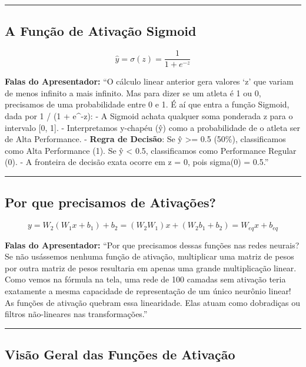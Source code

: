 \documentclass[
  letterpaper,
  DIV=11,
  numbers=noendperiod]{scrartcl}
\begin{document}
\begin{center}\rule{0.5\linewidth}{0.5pt}\end{center}

\subsection{A Função de Ativação
Sigmoid}\label{a-funuxe7uxe3o-de-ativauxe7uxe3o-sigmoid}

\[\hat{y} = \sigma(z) = \frac{1}{1 + e^{-z}}\]

\textbf{Falas do Apresentador:} ``O cálculo linear anterior gera valores
`z' que variam de menos infinito a mais infinito. Mas para dizer se um
atleta é 1 ou 0, precisamos de uma probabilidade entre 0 e 1. É aí que
entra a função Sigmoid, dada por 1 / (1 + e\^{}-z): - A Sigmoid achata
qualquer soma ponderada z para o intervalo {[}0, 1{]}. - Interpretamos
y-chapéu (ŷ) como a probabilidade de o atleta ser de Alta Performance. -
\textbf{Regra de Decisão}: Se ŷ \textgreater= 0.5 (50\%), classificamos
como Alta Performance (1). Se ŷ \textless{} 0.5, classificamos como
Performance Regular (0). - A fronteira de decisão exata ocorre em z = 0,
pois sigma(0) = 0.5.''

\begin{center}\rule{0.5\linewidth}{0.5pt}\end{center}

\subsection{Por que precisamos de
Ativações?}\label{por-que-precisamos-de-ativauxe7uxf5es}

\[y = W_2 (W_1 x + b_1) + b_2 = (W_2 W_1) x + (W_2 b_1 + b_2) = W_{eq} x + b_{eq}\]

\textbf{Falas do Apresentador:} ``Por que precisamos dessas funções nas
redes neurais? Se não usássemos nenhuma função de ativação, multiplicar
uma matriz de pesos por outra matriz de pesos resultaria em apenas uma
grande multiplicação linear. Como vemos na fórmula na tela, uma rede de
100 camadas sem ativação teria exatamente a mesma capacidade de
representação de um único neurônio linear! As funções de ativação
quebram essa linearidade. Elas atuam como dobradiças ou filtros
não-lineares nas transformações.''

\begin{center}\rule{0.5\linewidth}{0.5pt}\end{center}

\subsection{Visão Geral das Funções de
Ativação}\label{visuxe3o-geral-das-funuxe7uxf5es-de-ativauxe7uxe3o}
\end{document}
